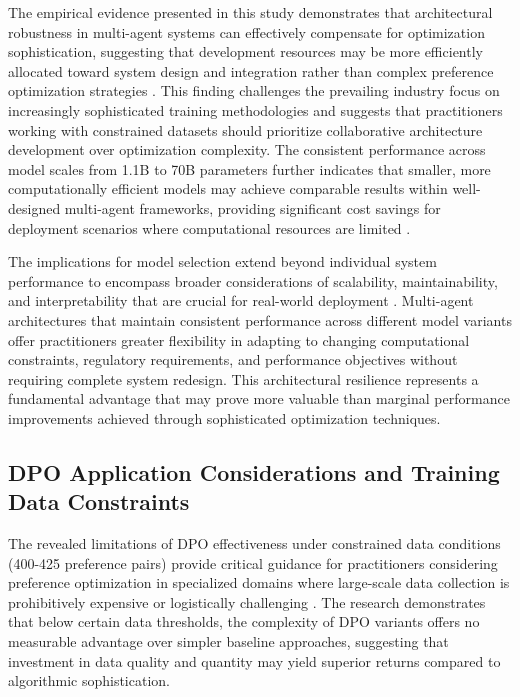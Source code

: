 The empirical evidence presented in this study demonstrates that architectural robustness in multi-agent systems can effectively compensate for optimization sophistication, suggesting that development resources may be more efficiently allocated toward system design and integration rather than complex preference optimization strategies \cite{ferrag2025llm_autonomous_agents, liu2024advances_foundation_agents}. This finding challenges the prevailing industry focus on increasingly sophisticated training methodologies and suggests that practitioners working with constrained datasets should prioritize collaborative architecture development over optimization complexity. The consistent performance across model scales from 1.1B to 70B parameters further indicates that smaller, more computationally efficient models may achieve comparable results within well-designed multi-agent frameworks, providing significant cost savings for deployment scenarios where computational resources are limited \cite{masterman2024landscape_emerging}.

The implications for model selection extend beyond individual system performance to encompass broader considerations of scalability, maintainability, and interpretability that are crucial for real-world deployment \cite{sapkota2025ai_agents_agentic}. Multi-agent architectures that maintain consistent performance across different model variants offer practitioners greater flexibility in adapting to changing computational constraints, regulatory requirements, and performance objectives without requiring complete system redesign. This architectural resilience represents a fundamental advantage that may prove more valuable than marginal performance improvements achieved through sophisticated optimization techniques.

\subsection{DPO Application Considerations and Training Data Constraints}

The revealed limitations of DPO effectiveness under constrained data conditions (400-425 preference pairs) provide critical guidance for practitioners considering preference optimization in specialized domains where large-scale data collection is prohibitively expensive or logistically challenging \cite{feng2024dpo_limitations, karthik2024scalable_ranked_preference}. The research demonstrates that below certain data thresholds, the complexity of DPO variants offers no measurable advantage over simpler baseline approaches, suggesting that investment in data quality and quantity may yield superior returns compared to algorithmic sophistication.

